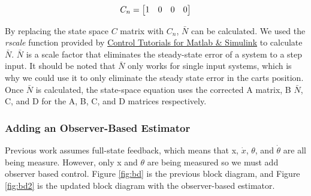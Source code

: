 \documentclass{article}
\begin{document}
\begin{equation}
\label{pcomp}
\centering
C_n = \begin{bmatrix}
1 & 0 & 0 & 0
\end{bmatrix}
\end{equation}
 
By replacing the state space $C$ matrix with $C_n$, $\bar{N}$ can be calculated. We used the \textit{rscale} function provided by \href{http://ctms.engin.umich.edu/CTMS/index.php?aux=Extras_rscale}{Control Tutorials for Matlab \& Simulink} to calculate $\bar{N}$. $\bar{N}$ is a scale factor that eliminates the steady-state error of a system to a step input. It should be noted that $\bar{N}$ only works for single input systems, which is why we could use it to only eliminate the steady state error in the carts position. Once $\bar{N}$ is calculated, the state-space equation uses the corrected A matrix, B $\bar{N}$, C, and D for the A, B, C, and D matrices respectively.
 
 \subsubsection{Adding an Observer-Based Estimator}
 Previous work assumes full-state feedback, which means that x, $\dot{x}$, $\theta$, and $\dot{\theta}$ are all being measure. However, only x and $\theta$ are being measured so we must add observer based control. Figure \ref{fig:bd} is the previous block diagram, and Figure \ref{fig:bd2} is the updated block diagram with the observer-based estimator.
\end{document}
